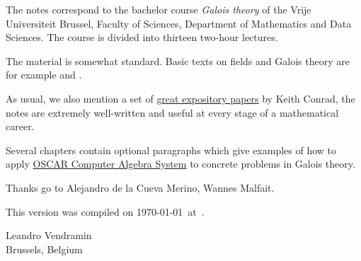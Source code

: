 \preface

The notes correspond to the bachelor 
course \emph{Galois theory} of the 
Vrije Universiteit Brussel, 
Faculty of Sciences, 
Department of Mathematics and Data Sciences. The course
is divided into thirteen two-hour lectures. 

The material is somewhat standard. Basic texts on fields and Galois theory 
are for example \cite{MR1645586} and 
\cite{MR3379917}. 

As usual, we also mention a set of 
\href{https://kconrad.math.uconn.edu/blurbs/}{great expository papers} by 
Keith Conrad, the notes are extremely well-written and useful  
at every stage of a mathematical career. 

Several chapters contain optional paragraphs which give examples of 
how to apply \href{https://oscar.computeralgebra.de/}{OSCAR Computer Algebra System}
to concrete problems in Galois theory. 

 
Thanks go to Alejandro de la Cueva Merino, Wannes Malfait. 

This version 
was compiled on \today~at~\currenttime.

\bigskip
\begin{flushright}
Leandro Vendramin\\Brussels, Belgium\par
\end{flushright}
